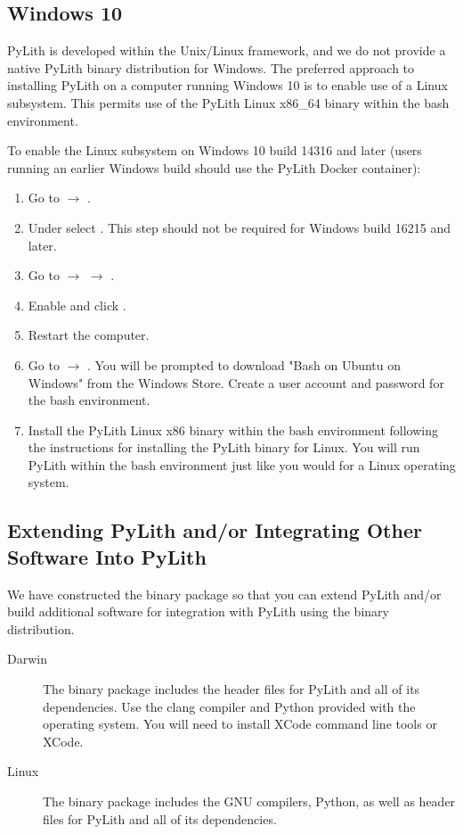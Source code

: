 \subsection{Windows 10}
\label{sec:install:windows}

PyLith is developed within the Unix/Linux framework, and we do not
provide a native PyLith binary distribution for Windows. The preferred
approach to installing PyLith on a computer running Windows 10 is to
enable use of a Linux subsystem. This permits use of the PyLith Linux
x86\_64 binary within the bash environment.

To enable the Linux subsystem on Windows 10 build 14316 and later
(users running an earlier Windows build should use the PyLith Docker
container):
\begin{enumerate}
\item Go to  $\rightarrow$ .
\item Under  select . This
  step should not be required for Windows build 16215 and later.
\item Go to  $\rightarrow$ 
  $\rightarrow$ .
\item Enable  and click .
\item Restart the computer.
\item Go to  $\rightarrow$ . You will be
  prompted to download "Bash on Ubuntu on Windows" from the Windows
  Store. Create a user account and password for the bash environment.
\item Install the PyLith Linux x86 binary within the bash environment
  following the instructions for installing the PyLith binary for
  Linux. You will run PyLith within the bash environment just like you
  would for a Linux operating system.
\end{enumerate}

\subsection{Extending PyLith and/or Integrating Other Software Into PyLith}

We have constructed the binary package so that you can extend PyLith
and/or build additional software for integration with PyLith using the
binary distribution.

\begin{description}
\item[Darwin] The binary package includes the header files for PyLith
  and all of its dependencies. Use the clang compiler and Python
  provided with the operating system. You will need to install XCode
  command line tools or XCode.
\item[Linux] The binary package includes the GNU compilers, Python, as
  well as header files for PyLith and all of its dependencies.
\end{description}

